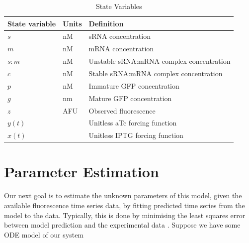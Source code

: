 \documentclass[10pt,journal]{./IEEE_latex_class/IEEEtran}
\begin{document}
\begin{table}[h]
\renewcommand{\arraystretch}{1.3}
\caption{State Variables}
\label{StateVariables}
\centering
\begin{tabular}{| l | l | l|}
\hline \textbf{State variable} & Units &  \textbf{Definition}  \\
\hline\hline $s$  & nM & sRNA concentration \\
\hline $m$ & nM & mRNA concentration  \\
\hline $s:m$ &  nM & Unstable sRNA:mRNA complex concentration  \\
\hline $c$ &  nM & Stable sRNA:mRNA complex concentration  \\
\hline $p$ & nM & Immature GFP concentration  \\
\hline $g$ &  nm & Mature GFP concentration  \\
\hline $z$ & AFU & Observed fluorescence  \\
\hline $y(t)$ & & Unitless aTc forcing function  \\
\hline $x(t)$ &  & Unitless IPTG forcing function  \\
\hline
\end{tabular}
\end{table}



\section{Parameter Estimation}
\label{Parameter Estimation}

Our next goal is to estimate the unknown parameters of this model, given the available fluorescence time series data, by fitting predicted time series from the model to the data. Typically, this is done by minimising the least squares error between model prediction and the experimental data \cite{Brewer2008,Algorithms2003, Hu2015}. Suppose we have some ODE model of our system
\end{document}
